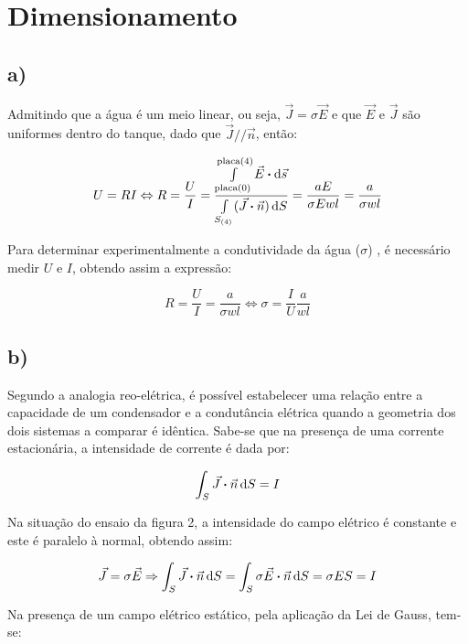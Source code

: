 \documentclass[portuguese, a4paper]{article}
\newcommand{\eq}{\Leftrightarrow} %
\begin{document}
	\section{Dimensionamento}
	\subsection{a)}

		\par
		Admitindo que a água é um meio linear, ou seja, $\vec{J} = \sigma \vec{E}$ e que $\vec{E}$ e $\vec{J}$ são uniformes dentro do tanque, dado que $\vec{J} // \vec{n}$, então:

		$$ U = RI \eq R = \dfrac{U}{I} = \dfrac{\int\limits_{\text{placa}(0)}^{\text{placa}(4)} \vec{E} \vdot \dd{\vec{s}}}{\int\limits_{S_{(4)}}(\vec{J} \vdot \vec{n})\dd{S}} = \dfrac{aE}{\sigma Ewl} = \dfrac{a}{\sigma wl}$$
		\par
		Para determinar experimentalmente a condutividade da água ($\sigma$) , é necessário medir $U$ e $I$, obtendo assim a expressão:

		$$ R = \frac{U}{I} = \dfrac{a}{\sigma wl} \eq \sigma = \frac{I}{U} \dfrac{a}{wl}$$

	\subsection{b)}

	\par
	Segundo a analogia reo-elétrica, é possível estabelecer uma relação entre a capacidade de um condensador e a condutância elétrica quando a geometria dos dois sistemas a comparar é idêntica.
	Sabe-se que na presença de uma corrente estacionária, a intensidade de corrente é dada por:

	\begin{align*}
		\int_S \vec{J} \vdot \vec{n}\dd{S} = I
	\end{align*}

	\par
	Na situação do ensaio da figura 2, a intensidade do campo elétrico é constante e este é paralelo à normal, obtendo assim:

	\begin{align*}
		\vec{J} = \sigma \vec{E} \Rightarrow \int_S \vec{J} \vdot \vec{n} \dd{S} = \int_S \sigma \vec{E} \vdot \vec{n} \dd{S}  = \sigma E S = I
	\end{align*}

	\par
	Na presença de um campo elétrico estático, pela aplicação da Lei de Gauss, tem-se:
\end{document}
